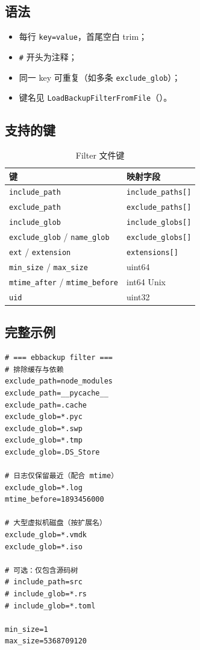 \subsection{语法}

\begin{itemize}[nosep]
  \item 每行 \texttt{key=value}，首尾空白 trim；
  \item \texttt{\#} 开头为注释；
  \item 同一 key 可重复（如多条 \texttt{exclude\_glob}）；
  \item 键名见 \texttt{LoadBackupFilterFromFile}（）。
\end{itemize}

\subsection{支持的键}

\begin{table}[htbp]
\centering
\caption{Filter 文件键}
\begin{tabular}{@{}ll@{}}
\toprule
键 & 映射字段 \\
\midrule
\texttt{include\_path} & \texttt{include\_paths[]} \\
\texttt{exclude\_path} & \texttt{exclude\_paths[]} \\
\texttt{include\_glob} & \texttt{include\_globs[]} \\
\texttt{exclude\_glob} / \texttt{name\_glob} & \texttt{exclude\_globs[]} \\
\texttt{ext} / \texttt{extension} & \texttt{extensions[]} \\
\texttt{min\_size} / \texttt{max\_size} & uint64 \\
\texttt{mtime\_after} / \texttt{mtime\_before} & int64 Unix \\
\texttt{uid} & uint32 \\
\bottomrule
\end{tabular}
\end{table}

\subsection{完整示例}

\begin{lstlisting}[caption={生产环境 filter 示例},label={lst:filter-prod}]
# === ebbackup filter ===
# 排除缓存与依赖
exclude_path=node_modules
exclude_path=__pycache__
exclude_path=.cache
exclude_glob=*.pyc
exclude_glob=*.swp
exclude_glob=*.tmp
exclude_glob=.DS_Store

# 日志仅保留最近（配合 mtime）
exclude_glob=*.log
mtime_before=1893456000

# 大型虚拟机磁盘（按扩展名）
exclude_glob=*.vmdk
exclude_glob=*.iso

# 可选：仅包含源码树
# include_path=src
# include_glob=*.rs
# include_glob=*.toml

min_size=1
max_size=5368709120
\end{lstlisting}

